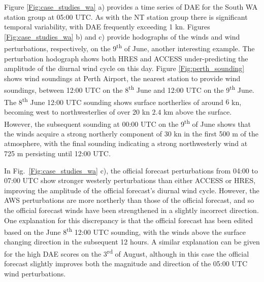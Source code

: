 \documentclass{ametsoc}
\begin{document}
Figure \ref{Fig:case_studies_wa} a) provides a time series of DAE for the South WA station group at 05:00 UTC. As with the NT station group there is significant temporal variability, with DAE frequently exceeding 1 kn. Figures \ref{Fig:case_studies_wa} b) and c) provide hodographs of the winds and wind perturbations, respectively, on the 9\textsuperscript{th} of June, another interesting example. The perturbation hodograph shows both HRES and ACCESS under-predicting the amplitude of the diurnal wind cycle on this day. Figure \ref{Fig:perth_sounding} shows wind soundings at Perth Airport, the nearest station to provide wind soundings, between 12:00 UTC on the 8\textsuperscript{th} June and 12:00 UTC on the 9\textsuperscript{th} June. The 8\textsuperscript{th} June 12:00 UTC sounding shows surface northerlies of around $6$ kn, becoming west to northwesterlies of over 20 kn $2.4$ km above the surface. However, the subsequent sounding at 00:00 UTC on the 9\textsuperscript{th} of June shows that the winds acquire a strong northerly component of 30 kn in the first 500 m of the atmosphere, with the final sounding indicating a strong northwesterly wind at 725 m persisting until 12:00 UTC. 

In Fig.~\ref{Fig:case_studies_wa} c), the official forecast perturbations from 04:00 to 07:00 UTC show stronger westerly perturbations than either ACCESS or HRES, improving the amplitude of the official forecast's diurnal wind cycle. However, the AWS perturbations are more northerly than those of the official forecast, and so the official forecast winds have been strengthened in a slightly incorrect direction. One explanation for this discrepancy is that the official forecast has been edited based on the June 8\textsuperscript{th} 12:00 UTC sounding, with the winds above the surface changing direction in the subsequent 12 hours. A similar explanation can be given for the high DAE scores on the  3\textsuperscript{rd} of August, although in this case the official forecast slightly improves both the magnitude and direction of the 05:00 UTC wind perturbations.
\end{document}
